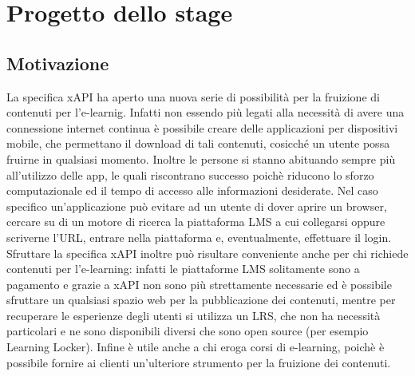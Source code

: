 \documentclass[../Tesi.tex]{subfiles}
\begin{document}
\section{Progetto dello stage}
	\subsection{Motivazione}
	La specifica xAPI ha aperto una nuova serie di possibilità per la fruizione di contenuti per l'e-learnig. Infatti non essendo più legati alla necessità di avere una connessione internet continua è possibile creare delle applicazioni per dispositivi mobile, che permettano il download di tali contenuti, cosicché un utente possa fruirne in qualsiasi momento. Inoltre le persone si stanno abituando sempre più all'utilizzo delle app, le quali riscontrano successo poichè riducono lo sforzo computazionale ed il tempo di accesso alle informazioni desiderate. Nel caso specifico un'applicazione può evitare ad un utente di dover aprire un browser, cercare su di un motore di ricerca la piattaforma LMS a cui collegarsi oppure scriverne l'URL, entrare nella piattaforma e, eventualmente, effettuare il login. Sfruttare la specifica xAPI inoltre può risultare conveniente anche per chi richiede contenuti per l'e-learning: infatti le piattaforme LMS solitamente sono a pagamento e grazie a xAPI non sono più strettamente necessarie ed è possibile sfruttare un qualsiasi spazio web per la pubblicazione dei contenuti, mentre per recuperare le esperienze degli utenti si utilizza un LRS, che non ha necessità particolari e ne sono disponibili diversi che sono open source (per esempio Learning Locker). Infine è utile anche a chi eroga corsi di e-learning, poichè è possibile fornire ai clienti un'ulteriore strumento per la fruizione dei contenuti.
\end{document}

